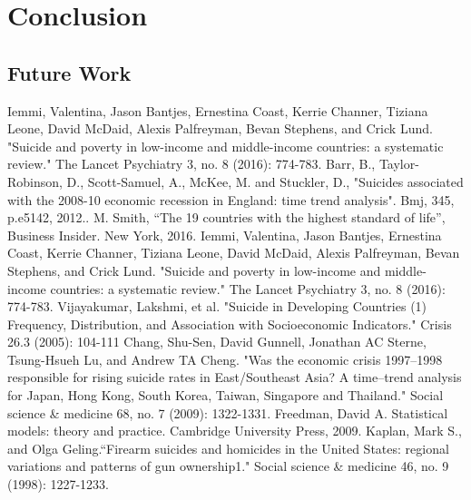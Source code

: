 \documentclass[conference]{IEEEtran}
\begin{document}
\section{Conclusion}

\subsection{Future Work}

\begin{thebibliography}{00}
Iemmi, Valentina, Jason Bantjes, Ernestina Coast, Kerrie Channer, Tiziana Leone, David McDaid, Alexis Palfreyman, Bevan Stephens, and Crick Lund. "Suicide and poverty in low-income and middle-income countries: a systematic review." The Lancet Psychiatry 3, no. 8 (2016): 774-783.
 Barr, B., Taylor-Robinson, D., Scott-Samuel, A., McKee, M. and Stuckler, D., "Suicides associated with the 2008-10 economic recession in England: time trend analysis". Bmj, 345, p.e5142, 2012..
 M. Smith, ``The 19 countries with the highest standard of life'', Business Insider. New York, 2016.
 Iemmi, Valentina, Jason Bantjes, Ernestina Coast, Kerrie Channer, Tiziana Leone, David McDaid, Alexis Palfreyman, Bevan Stephens, and Crick Lund. "Suicide and poverty in low-income and middle-income countries: a systematic review." The Lancet Psychiatry 3, no. 8 (2016): 774-783.
 Vijayakumar, Lakshmi, et al. "Suicide in Developing Countries (1) Frequency, Distribution, and Association with Socioeconomic Indicators." Crisis 26.3 (2005): 104-111
 Chang, Shu-Sen, David Gunnell, Jonathan AC Sterne, Tsung-Hsueh Lu, and Andrew TA Cheng. "Was the economic crisis 1997–1998 responsible for rising suicide rates in East/Southeast Asia? A time–trend analysis for Japan, Hong Kong, South Korea, Taiwan, Singapore and Thailand." Social science \& medicine 68, no. 7 (2009): 1322-1331.
Freedman, David A. Statistical models: theory and practice. Cambridge University Press, 2009.
Kaplan, Mark S., and Olga Geling.``Firearm suicides and homicides in the United States: regional variations and patterns of gun ownership1." Social science \& medicine 46, no. 9 (1998): 1227-1233.
\end{thebibliography}
\vspace{12pt}
\end{document}
